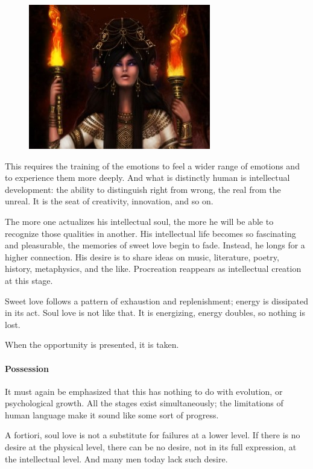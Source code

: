 \begin{figure}
\includegraphics[scale=.4]{a20210216DiotimaUnveiled-img001.jpg} 
\end{figure}

This requires the training of the emotions to feel a wider range of emotions and to experience them more deeply. And what is distinctly human is intellectual development: the ability to distinguish right from wrong, the real from the unreal. It is the seat of creativity, innovation, and so on.

The more one actualizes his intellectual soul, the more he will be able to recognize those qualities in another. His intellectual life becomes so fascinating and pleasurable, the memories of sweet love begin to fade. Instead, he longs for a higher connection. His desire is to share ideas on music, literature, poetry, history, metaphysics, and the like. Procreation reappears as intellectual creation at this stage.

Sweet love follows a pattern of exhaustion and replenishment; energy is dissipated in its act. Soul love is not like that. It is energizing, energy doubles, so nothing is lost.

When the opportunity is presented, it is taken.

\paragraph{Possession}
It must again be emphasized that this has nothing to do with evolution, or psychological growth. All the stages exist simultaneously; the limitations of human language make it sound like some sort of progress.

A fortiori, soul love is not a substitute for failures at a lower level. If there is no desire at the physical level, there can be no desire, not in its full expression, at the intellectual level. And many men today lack such desire.

